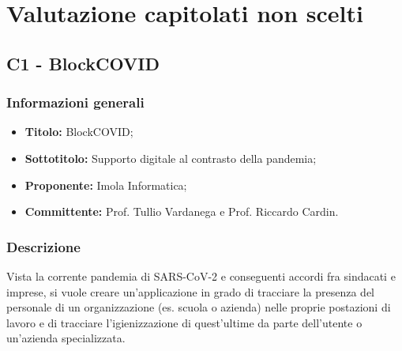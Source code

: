 \documentclass[]{article}
\begin{document}
	\newpage

	\section{Valutazione capitolati non scelti}
		\subsection{C1 - BlockCOVID}
			\subsubsection{Informazioni generali}
			\begin{itemize}
				\item \textbf{Titolo:} BlockCOVID;
				\item \textbf{Sottotitolo:} Supporto digitale al contrasto della pandemia;
				\item \textbf{Proponente:} Imola Informatica;
				\item \textbf{Committente:} Prof. Tullio Vardanega e Prof. Riccardo Cardin.
			\end{itemize}

			\subsubsection{Descrizione}
			Vista la corrente pandemia di SARS-CoV-2 e conseguenti accordi fra sindacati e imprese, si vuole creare un'applicazione in grado di tracciare la presenza del personale di un organizzazione (es. scuola o azienda) nelle proprie postazioni di lavoro e di tracciare l'igienizzazione di quest'ultime da parte dell'utente o un'azienda specializzata.
\end{document}
